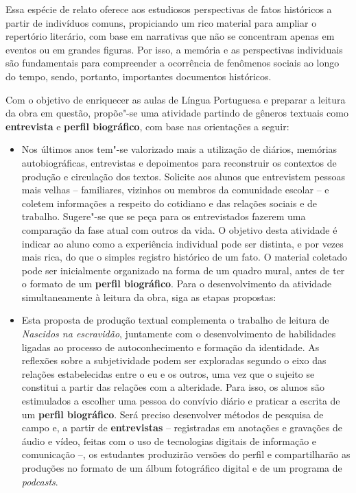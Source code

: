 \documentclass[12pt]{extarticle}
\begin{document}
Essa espécie de relato oferece aos estudiosos perspectivas de fatos
históricos a partir de indivíduos comuns, propiciando um rico material
para ampliar o repertório literário, com base em narrativas que não se
concentram apenas em eventos ou em grandes figuras. Por isso, a memória
e as perspectivas individuais são fundamentais para compreender a
ocorrência de fenômenos sociais ao longo do tempo, sendo, portanto,
importantes documentos históricos.

Com o objetivo de enriquecer as aulas de Língua Portuguesa e preparar a
leitura da obra em questão, propõe"-se uma atividade partindo de gêneros
textuais como \textbf{entrevista} e \textbf{perfil biográfico}, com base
nas orientações a seguir:

\begin{itemize}
\item
  Nos últimos anos tem"-se valorizado mais a utilização de diários,
  memórias autobiográficas, entrevistas e depoimentos para reconstruir
  os contextos de produção e circulação dos textos. Solicite aos alunos
  que entrevistem pessoas mais velhas -- familiares, vizinhos ou membros
  da comunidade escolar -- e coletem informações a respeito do cotidiano
  e das relações sociais e de trabalho. Sugere"-se que se peça para os
  entrevistados fazerem uma comparação da fase atual com outros da vida.
  O objetivo desta atividade é indicar ao aluno como a experiência
  individual pode ser distinta, e por vezes mais rica, do que o simples
  registro histórico de um fato. O material coletado pode ser
  inicialmente organizado na forma de um quadro mural, antes de ter o
  formato de um \textbf{perfil biográfico}. Para o desenvolvimento da
  atividade simultaneamente à leitura da obra, siga as etapas propostas:

\item
  Esta proposta de produção textual complementa o trabalho de leitura de
  \emph{Nascidos na escravidão}, juntamente com o desenvolvimento de
  habilidades ligadas ao processo de autoconhecimento e formação da
  identidade. As reflexões sobre a subjetividade podem ser exploradas
  segundo o eixo das relações estabelecidas entre o eu e os outros, uma
  vez que o sujeito se constitui a partir das relações com a alteridade.
  Para isso, os alunos são estimulados a escolher uma pessoa do convívio
  diário e praticar a escrita de um \textbf{perfil biográfico}. Será
  preciso desenvolver métodos de pesquisa de campo e, a partir de
  \textbf{entrevistas} -- registradas em anotações e gravações de áudio
  e vídeo, feitas com o uso de tecnologias digitais de informação e
  comunicação --, os estudantes produzirão versões do perfil e
  compartilharão as produções no formato de um álbum fotográfico digital
  e de um programa de \emph{podcasts}.
\end{itemize}
\end{document}
